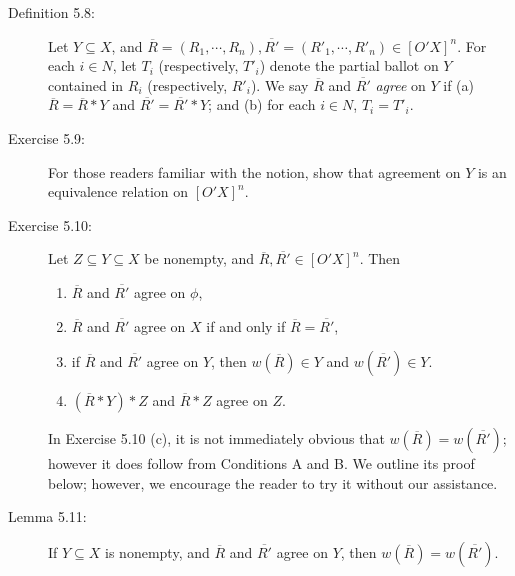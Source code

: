 \documentclass{article}
\begin{document}
\begin{description}

\item[Definition 5.8:] Let $Y \subseteq X$, and $\overline{R}=(R_{1},\cdots,R_{n}), \overline{R'}=(R'_{1},\cdots,R'_{n}) \in [O'X]^{n}$. For each $i \in N$, let $T_{i}$ (respectively, $T'_{i}$) denote the partial ballot on $Y$ contained in $R_{i}$ (respectively, $R'_{i}$). We say $\overline{R}$ and $\overline{R'}$ \emph{agree} on $Y$ if (a) $\overline{R} = \overline{R}*Y$ and $\overline{R'} = \overline{R'}*Y$; and (b) for each $i \in N$, $T_{i} = T'_{i}$.

\item[Exercise 5.9:] For those readers familiar with the notion, show that agreement on $Y$ is an equivalence relation on $[O'X]^{n}$.

\item[Exercise 5.10:] Let $Z \subseteq Y \subseteq X$ be nonempty, and $\overline{R}, \overline{R'} \in [O'X]^{n}$. Then
  \begin{enumerate}[\hspace{1cm}(a)]
    \item $\overline{R}$ and $\overline{R'}$ agree on $\phi$, 
    \item $\overline{R}$ and $\overline{R'}$ agree on $X$ if and only if $\overline{R} = \overline{R'}$,
    \item if $\overline{R}$ and $\overline{R'}$ agree on $Y$, then $w(\overline{R}) \in Y$ and $w(\overline{R'}) \in Y$.
    \item $(\overline{R}*Y)*Z$ and $\overline{R}*Z$ agree on $Z$.
  \end{enumerate}

  In Exercise 5.10 (c), it is not immediately obvious that $w(\overline{R}) = w(\overline{R'})$; however it does follow from Conditions A and B. We outline its proof below; however, we encourage the reader to try it without our assistance.

\item[Lemma 5.11:] If $Y \subseteq X$ is nonempty, and $\overline{R}$ and $\overline{R'}$ agree on $Y$, then $w(\overline{R}) = w(\overline{R'})$.

\end{description}
\end{document}
